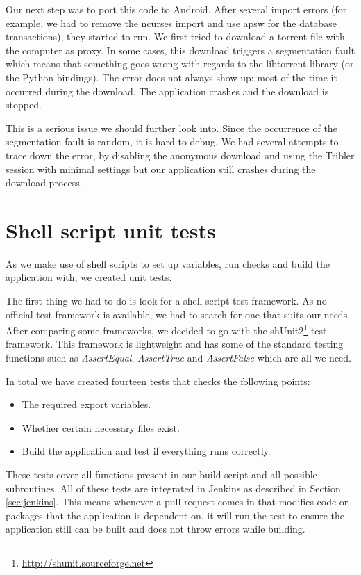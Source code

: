 	Our next step was to port this code to Android. After several import errors (for example, we had to remove the ncurses import and use apsw for the database transactions), they started to run. We first tried to download a torrent file with the computer as proxy. In some cases, this download triggers a segmentation fault which means that something goes wrong with regards to the libtorrent library (or the Python bindings). The error does not always show up: most of the time it occurred during the download. The application crashes and the download is stopped.
	
	This is a serious issue we should further look into. Since the occurrence of the segmentation fault is random, it is hard to debug. We had several attempts to trace down the error, by disabling the anonymous download and using the Tribler session with minimal settings but our application still crashes during the download process.

	\section{Shell script unit tests}
		As we make use of shell scripts to set up variables, run checks and build the application with, we created unit tests.
		
		The first thing we had to do is look for a shell script test framework. As no official test framework is available, we had to search for one that suits our needs. After comparing some frameworks, we decided to go with the shUnit2\footnote{\url{http://shunit.sourceforge.net}} test framework. This framework is lightweight and has some of the standard testing functions such as \emph{AssertEqual}, \emph{AssertTrue} and \emph{AssertFalse} which are all we need. 
		
		In total we have created fourteen tests that checks the following points:
		
		\begin{itemize}
			\item The required export variables.
			\item Whether certain necessary files exist.
			\item Build the application and test if everything runs correctly.
		\end{itemize}
		
		These tests cover all functions present in our build script and all possible subroutines. All of these tests are integrated in Jenkins as described in Section \ref{sec:jenkins}. This means whenever a pull request comes in that modifies code or packages that the application is dependent on, it will run the test to ensure the application still can be built and does not throw errors while building.


